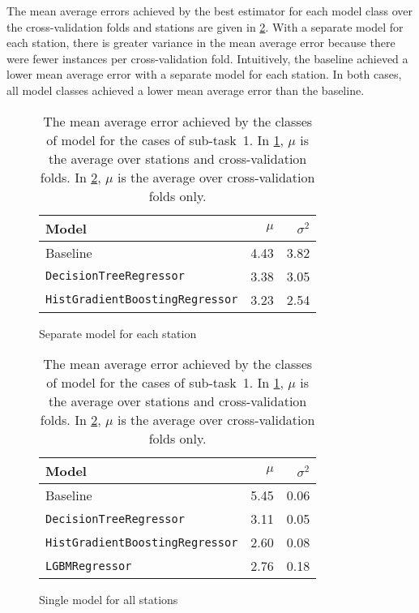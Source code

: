 \documentclass[11pt]{extarticle}
\begin{document}
The mean average errors achieved by the best estimator for each model class over the
cross-validation folds and stations are given in \cref{tab:chart-subtask-1}.
With a separate model for each station, there is greater variance in the mean average
error because there were fewer instances per cross-validation fold.
Intuitively, the baseline achieved a lower mean average error with a separate model for
each station.
In both cases, all model classes achieved a lower mean average error than the baseline.

\begin{table}
  \centering
  \begin{subfigure}{\textwidth}
    \centering
    \begin{tabular}{lrr}
      \toprule
      Model                                  & $\mu$ & $\sigma^2$
      \\
      \midrule
      Baseline                               & 4.43  & 3.82
      \\
      \texttt{DecisionTreeRegressor}         & 3.38  & 3.05
      \\
      \texttt{HistGradientBoostingRegressor} & 3.23  & 2.54
      \\
      \bottomrule
    \end{tabular}
    \caption{Separate model for each station}
    \label{tab:chart-subtask-1-1}
  \end{subfigure}
  \par\bigskip\bigskip
  \begin{subfigure}{\textwidth}
    \centering
    \begin{tabular}{lrr}
      \toprule
      Model                                  & $\mu$ & $\sigma^2$
      \\
      \midrule
      Baseline                               & 5.45  & 0.06
      \\
      \texttt{DecisionTreeRegressor}         & 3.11  & 0.05
      \\
      \texttt{HistGradientBoostingRegressor} & 2.60  & 0.08
      \\
      \texttt{LGBMRegressor}                 & 2.76  & 0.18
      \\
      \bottomrule
    \end{tabular}
    \caption{Single model for all stations}
    \label{tab:chart-subtask-1-2}
  \end{subfigure}
  \caption{The mean average error achieved by the classes of model for the cases of sub-task~1.
    In \cref{tab:chart-subtask-1-1}, $\mu$ is the average over stations and
    cross-validation folds.
    In \cref{tab:chart-subtask-1-2}, $\mu$ is the average over cross-validation folds only.
  }
  \label{tab:chart-subtask-1}
\end{table}
\end{document}
